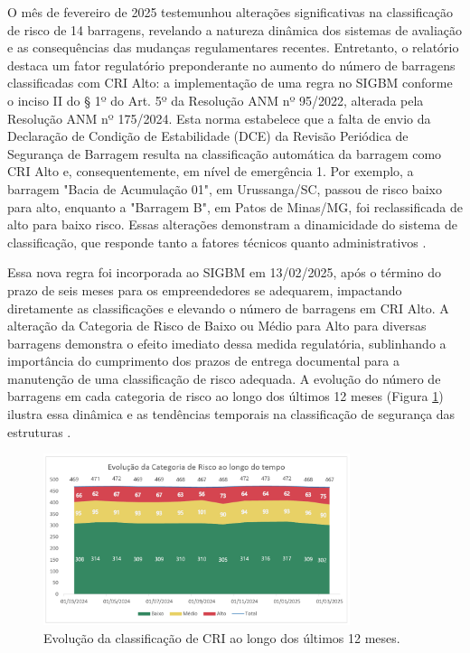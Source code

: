 O mês de fevereiro de 2025 testemunhou alterações significativas na classificação de risco de 14 barragens, revelando a natureza dinâmica dos sistemas de avaliação e as consequências das mudanças regulamentares recentes. Entretanto, o relatório destaca um fator regulatório preponderante no aumento do número de barragens classificadas com CRI Alto: a implementação de uma regra no SIGBM conforme o inciso II do § 1º do Art. 5º da Resolução ANM nº 95/2022, alterada pela Resolução ANM nº 175/2024. Esta norma estabelece que a falta de envio da Declaração de Condição de Estabilidade (DCE) da Revisão Periódica de Segurança de Barragem resulta na classificação automática da barragem como CRI Alto e, consequentemente, em nível de emergência 1. Por exemplo, a barragem "Bacia de Acumulação 01", em Urussanga/SC, passou de risco baixo para alto, enquanto a "Barragem B", em Patos de Minas/MG, foi reclassificada de alto para baixo risco. Essas alterações demonstram a dinamicidade do sistema de classificação, que responde tanto a fatores técnicos quanto administrativos \cite{anm2025boletim}.

Essa nova regra foi incorporada ao SIGBM em 13/02/2025, após o término do prazo de seis meses para os empreendedores se adequarem, impactando diretamente as classificações e elevando o número de barragens em CRI Alto. A alteração da Categoria de Risco de Baixo ou Médio para Alto para diversas barragens demonstra o efeito imediato dessa medida regulatória, sublinhando a importância do cumprimento dos prazos de entrega documental para a manutenção de uma classificação de risco adequada. A evolução do número de barragens em cada categoria de risco ao longo dos últimos 12 meses (Figura \ref{fig:evolucao_classificacao}) ilustra essa dinâmica e as tendências temporais na classificação de segurança das estruturas \cite{anm2025boletim}.

\begin{figure}[htbp]
    \centering
    \includegraphics[width=0.8\textwidth]{figures/image31_evolucao_classificacao_12_meses.png}
    \caption{Evolução da classificação de CRI ao longo dos últimos 12 meses.}
    \label{fig:evolucao_classificacao}
\end{figure}

